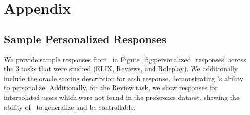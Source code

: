 \section{Appendix}
\subsection{Sample Personalized Responses}
\label{sec:app_samples}
We provide sample responses from \methodname\ in Figure~\ref{fig:personalized_responses} across the 3 tasks that were studied (ELIX, Reviews, and Roleplay). We additionally include the oracle scoring description for each response, demonstrating \methodname's ability to personalize. Additionally, for the Review task, we show responses for interpolated users which were not found in the preference dataset, showing the ability of \methodname\ to generalize and be controllable.

